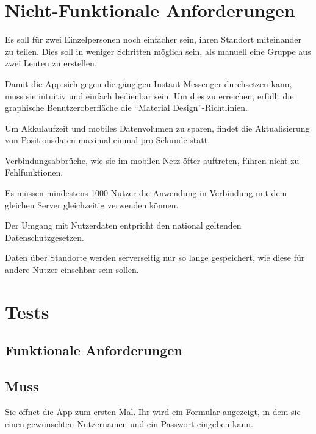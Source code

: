 \documentclass[parskip=full,11pt]{scrartcl}
\begin{document}
\pagebreak
\section{Nicht-Funktionale Anforderungen}

%
Es soll für zwei Einzelpersonen noch einfacher sein, ihren Standort miteinander
zu teilen. Dies soll in weniger Schritten möglich sein, als manuell eine
Gruppe aus zwei Leuten zu erstellen.

Damit die App sich gegen die gängigen Instant Messenger durchsetzen kann, muss
sie intuitiv und einfach bedienbar sein. Um dies zu erreichen, erfüllt die
graphische Benutzeroberfläche die \enquote{Material Design}-Richtlinien.

Um Akkulaufzeit und mobiles Datenvolumen zu sparen, findet die Aktualisierung
von Positionsdaten maximal einmal pro Sekunde statt.

Verbindungsabbrüche, wie sie im mobilen Netz öfter auftreten, führen nicht zu
Fehlfunktionen.

Es müssen mindestens 1000 Nutzer die Anwendung in Verbindung mit dem gleichen
Server gleichzeitig verwenden können.

%
Der Umgang mit Nutzerdaten entpricht den national geltenden
Datenschutzgesetzen.

Daten über Standorte werden serverseitig nur so lange gespeichert, wie diese
für andere Nutzer einsehbar sein sollen.

\pagebreak
\section{Tests}
\subsection{Funktionale Anforderungen}
\subsection{Muss}

{Sie öffnet die App zum ersten Mal.}
{Ihr wird ein Formular angezeigt, in dem sie einen gewünschten Nutzernamen
und ein Passwort eingeben kann.}
\end{document}
